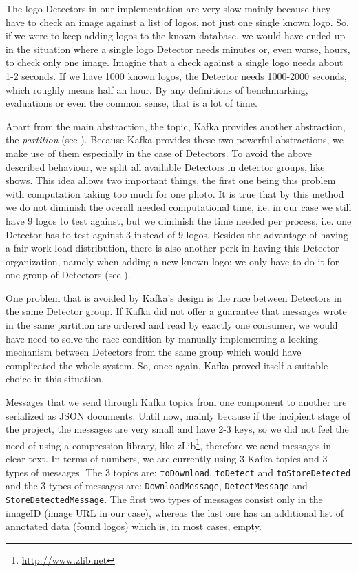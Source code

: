 The logo Detectors in our implementation are very slow
mainly because they have to check an image against a list of logos, not just
one single known logo. So, if we were to keep adding logos to the known
database, we would have ended up in the situation where a single logo Detector
needs minutes or, even worse, hours, to check only one image. Imagine that a
check against a single logo needs about
1-2 seconds. If we have 1000 known logos, the Detector needs 1000-2000
seconds,  which roughly means half an hour. By any definitions of
benchmarking, evaluations or even the common sense, that is a lot of
time.

Apart from the main abstraction, the topic, Kafka provides another abstraction, the
\textit{partition} (see ). Because Kafka
provides these two powerful abstractions, we make use of them especially in
the case of Detectors. To avoid the above described behaviour, we split all
available Detectors in detector groups, like
 shows. This idea allows two
important things, the first one being this problem with computation taking too
much for one photo. It is true that by this method we do not diminish the
overall needed computational time, i.e. in our case we still have 9 logos to
test against, but we diminish the time needed per process, i.e. one Detector
has to test against 3 instead of 9 logos. Besides the advantage of having a
fair work load distribution, there is also another perk in having this
Detector organization, namely when adding a new known logo: we only have to do
it for one group of Detectors (see ).

One problem that is avoided by Kafka's design is the race between Detectors in
the same Detector group. If Kafka did not offer a guarantee that messages
wrote in the same partition are ordered and read by exactly one consumer, we
would have need to solve the race condition by manually implementing a locking
mechanism between Detectors from the same group which would have complicated
the whole system. So, once again, Kafka proved itself a suitable choice in
this situation.

Messages that we send through Kafka topics from one component to another are
serialized as JSON documents. Until now, mainly because if the incipient stage
of the project, the messages are very small and have 2-3 keys, so we did not
feel the need of using a compression library, like
zLib\footnote{\url{http://www.zlib.net}}, therefore we send messages in clear
text. In terms of numbers, we are currently using 3 Kafka topics and 3 types
of messages. The 3 topics are: \texttt{toDownload}, \texttt{toDetect} and
\texttt{toStoreDetected} and the 3 types of messages are:
\texttt{DownloadMessage}, \texttt{DetectMessage} and
\texttt{StoreDetectedMessage}. The first two types of messages consist only in
the imageID (image URL in our case), whereas the last one has an additional
list of annotated data (found logos) which is, in most cases, empty.

